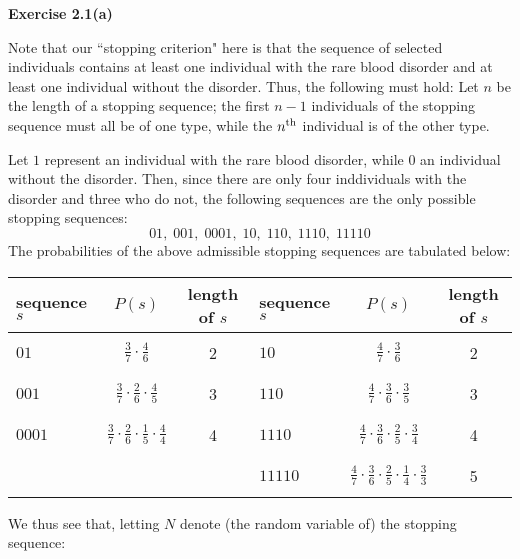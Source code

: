 
\noindent
\textbf{Exercise 2.1(a)}

Note that our ``stopping criterion" here is that the sequence of selected individuals contains at
least one individual with the rare blood disorder and at least one individual without the disorder.
Thus, the following must hold:  Let $n$ be the length of a stopping sequence; the first $n-1$
individuals of the stopping sequence must all be of one type, while the $n^{\textnormal{th}}$
individual is of the other type.

Let $1$ represent an individual with the rare blood disorder, while $0$ an individual without
the disorder.  Then, since there are only four inddividuals with the disorder and three who do not,
the following sequences are the only possible stopping sequences:
\begin{equation*}
	01, \; 001, \; 0001, \; 10, \; 110, \; 1110, \; 11110
\end{equation*}
The probabilities of the above admissible stopping sequences are tabulated below:
\begin{center}
\begin{tabular}{|l|c|c||l|c|c|}
\hline
sequence $s$ & $P(s)$ & length of $s$ & sequence $s$ & $P(s)$ & length of $s$\\
\hline\hline
&&&&&\\
$01$ & $\frac{3}{7}\cdot\frac{4}{6}$ & 2 &
$10$ & $\frac{4}{7}\cdot\frac{3}{6}$ & 2 \\
&&&&&\\
\hline
&&&&&\\
$001$ & $\frac{3}{7}\cdot\frac{2}{6}\cdot\frac{4}{5}$ & 3 &
$110$ & $\frac{4}{7}\cdot\frac{3}{6}\cdot\frac{3}{5}$ & 3 \\
&&&&&\\
\hline
&&&&&\\
$0001$ & $\frac{3}{7}\cdot\frac{2}{6}\cdot\frac{1}{5}\cdot\frac{4}{4}$ & 4 &
$1110$ & $\frac{4}{7}\cdot\frac{3}{6}\cdot\frac{2}{5}\cdot\frac{3}{4}$ & 4 \\
&&&&&\\
\hline
&&&&&\\
 & & &
$11110$ & $\frac{4}{7}\cdot\frac{3}{6}\cdot\frac{2}{5}\cdot\frac{1}{4}\cdot\frac{3}{3}$ & 5 \\
&&&&&\\
\hline
\end{tabular}
\end{center}
We thus see that, letting $N$ denote (the random variable of) the stopping sequence:
